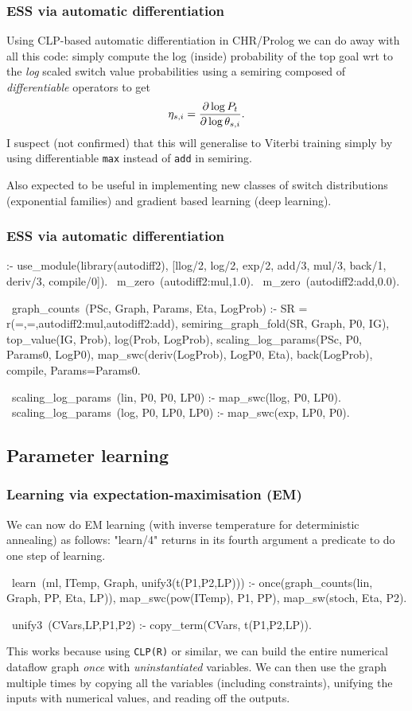 \documentclass[usenames,dvipsnames]{beamer}
\newenvironment{isframe}[1][untitled]{\begin{frame}[fragile=singleslide,environment=isframe]\frametitle{#1}}{\end{frame}}
\def\pl#1{\lstinline[language={[SWI]Prolog},columns=fullflexible]{#1}}
\begin{document}
\begin{isframe}[ESS via automatic differentiation]
	\def\sw#1{#1_{s,i}}
	Using CLP-based automatic differentiation in CHR/Prolog \citep{Abdallah2017} we can
	do away with all this code: simply compute the log (inside) probability of the top
	goal wrt to the \emph{log} scaled switch value probabilities using a semiring
  composed of \emph{differentiable} operators to get
	\[ 
		\sw\eta = \pd{\log P_t}{\log \sw\theta}.
	\]
	I suspect (not confirmed) that this will generalise to Viterbi training simply by using
  differentiable \pl{max} instead of \pl{add} in semiring.

	Also expected to be useful in implementing new classes of switch distributions (\eg exponential 
  families) and gradient based learning (\cf deep learning).
\end{isframe}

\begin{isframe}[ESS via automatic differentiation]
\begin{prolog}[xleftmargin=0em,basicstyle=\small]
	:- use_module(library(autodiff2),  [llog/2, log/2, exp/2, add/3, mul/3, 
                                      back/1, deriv/3, compile/0]).
	~m_zero~(autodiff2:mul,1.0).
	~m_zero~(autodiff2:add,0.0).

	~graph_counts~(PSc, Graph, Params, Eta, LogProb) :-
		 SR = r(=,=,autodiff2:mul,autodiff2:add),
		 semiring_graph_fold(SR, Graph, P0, IG),
		 top_value(IG, Prob), log(Prob, LogProb),
		 scaling_log_params(PSc, P0, Params0, LogP0),
		 map_swc(deriv(LogProb), LogP0, Eta),
		 back(LogProb), compile, Params=Params0.

	~scaling_log_params~(lin, P0, P0,  LP0) :- map_swc(llog, P0, LP0).
	~scaling_log_params~(log, P0, LP0, LP0) :- map_swc(exp, LP0, P0).
\end{prolog}
\end{isframe}

\subsection{Parameter learning}

\begin{isframe}[Learning via expectation-maximisation (EM)]
We can now do EM learning (with
inverse temperature for deterministic annealing) as follows:
"learn/4" returns in its fourth argument a predicate to do one
step of learning.
\begin{prolog}[xleftmargin=0em,basicstyle=\small]
	~learn~(ml, ITemp, Graph, unify3(t(P1,P2,LP))) :-
		 once(graph_counts(lin, Graph, PP, Eta, LP)),
		 map_swc(pow(ITemp), P1, PP),
		 map_sw(stoch, Eta, P2).

	~unify3~(CVars,LP,P1,P2) :- copy_term(CVars, t(P1,P2,LP)).
\end{prolog}
This works because using \pl{CLP(R)} or similar, we can build the entire numerical dataflow graph 
\emph{once} with \emph{uninstantiated} variables. We can then use the graph
multiple times by copying all the variables (including constraints), unifying the inputs with
numerical values, and reading off the outputs.
\end{isframe}
\end{document}
